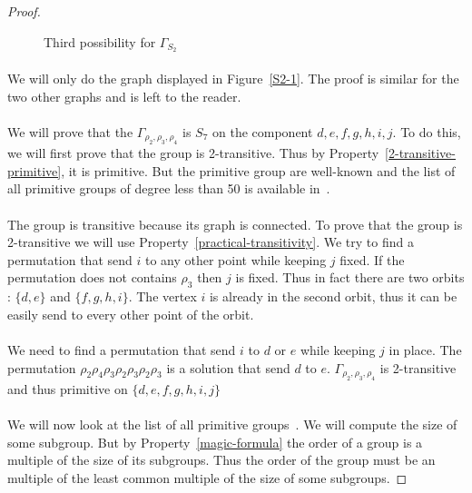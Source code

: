 \begin{proof}
\begin{figure}[H]
\begin{center}
\begin{tikzpicture}[scale=.8]
      \end{tikzpicture}
      \caption{Third possibility for $\Gamma_{S_2}$}
    \end{center}
  \end{figure}

  \paragraph{}
  We will only do the graph displayed in Figure~\ref{S2-1}. The proof is similar for the two other graphs and is left to the reader.

  \paragraph{}
  We will prove that the $\Gamma_{\rho_2,\rho_3,\rho_4}$ is $S_7$ on the component $d,e,f,g,h,i,j$. To do this, we will first prove that the group is 2-transitive. Thus by Property~\ref{2-transitive-primitive}, it is primitive. But the primitive group are well-known and the list of all primitive groups of degree less than 50 is available in~\cite{buekenhout1996list}.

  \paragraph{}
  The group is transitive because its graph is connected. To prove that the group is 2-transitive we will use Property~\ref{practical-transitivity}. We try to find a permutation that send $i$ to any other point while keeping $j$ fixed. If the permutation does not contains $\rho_3$ then $j$ is fixed. Thus in fact there are two orbits : $\{d,e\}$ and $\{f,g,h,i\}$. The vertex $i$ is already in the second orbit, thus it can be easily send to every other point of the orbit.

  \paragraph{}
  We need to find a permutation that send $i$ to $d$ or $e$ while keeping $j$ in place. The permutation $\rho_2 \rho_4 \rho_3 \rho_2 \rho_3 \rho_2 \rho_3$ is a solution that send $d$ to $e$. $\Gamma_{\rho_2, \rho_3, \rho_4}$ is 2-transitive and thus primitive on $\{d,e,f,g,h,i,j\}$

  \paragraph{}
  We will now look at the list of all primitive groups~\cite{buekenhout1996list}. We will compute the size of some subgroup. But by Property~\ref{magic-formula} the order of a group is a multiple of the size of its subgroups. Thus the order of the group must be an multiple of the least common multiple of the size of some subgroups.


\end{proof}

